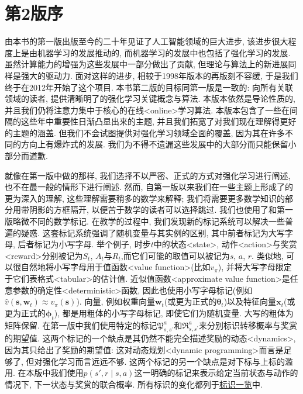 {}
\section*{第2版序}\label{sec:pautoreface_2}

由本书的第一版出版至今的二十年见证了人工智能领域的巨大进步, 该进步很大程度上是由机器学习的发展推动的, 而机器学习的发展中也包括了强化学习的发展. 虽然计算能力的增强为这些发展中一部分做出了贡献, 但理论与算法上的新进展同样是强大的驱动力. 面对这样的进步, 相较于1998年版本的再版刻不容缓, 于是我们终于在2012年开始了这个项目. 本书第二版的目标同第一版是一致的: 向所有关联领域的读者, 提供清晰明了的强化学习关键概念与算法. 本版本依然是导论性质的, 并且我们仍将注意力集中于核心的在线<online>学习算法. 本版本包含了一些在间隔的这些年中重要性日渐凸显出来的主题, 并且我们拓宽了对我们现在理解得更好的主题的涵盖. 但我们不会试图提供对强化学习领域全面的覆盖, 因为其在许多不同的方向上有爆炸式的发展. 我们为不得不遗漏这些发展中的大部分而只能保留小部分而道歉.

就像在第一版中做的那样, 我们选择不以严密、正式的方式对强化学习进行阐述, 也不在最一般的情形下进行阐述. 然而, 自第一版以来我们在一些主题上形成了的更为深入的理解, 这些理解需要稍多的数学来解释; 我们将需要更多数学知识的部分用带阴影的方框隔开, 以便苦于数学的读者可以选择跳过. 我们也使用了和第一版略微不同的数学标记. 在教学的过程中, 我们发现新的标记系统可以解决一些普遍的疑惑. 这套标记系统强调了随机变量与其实例的区别, 其中前者标记为大写字母, 后者标记为小写字母. 举个例子, 时步$t$中的状态<state>, 动作<action>与奖赏<reward>分别被记为$S_t$, $A_t$与$R_t$,而它们可能的取值可以被记为$s$, $a$, $r$. 类似地, 可以很自然地将小写字母用于值函数<value function>(比如$v_{\pi}$), 并将大写字母限定于它们表格式<tabular>的估计值.  近似值函数<approximate value function>是任意参数的确定性<deterministic>函数, 因此也使用小写字母标记(例如$\hat v (\mathbf s, \mathbf w_t) \approx v_\pi(\mathbf s)$). 向量, 例如权重向量$\mathbf w_t$(或更为正式的${\boldsymbol \theta}_t$)以及特征向量$\mathbf x_t$(或更为正式的$\boldsymbol \phi_t$), 都是用粗体的小写字母标记, 即使它们为随机变量. 大写的粗体为矩阵保留. 在第一版中我们使用特定的标记$\mathfrak P_{s, s^\prime}^a$和$\mathfrak R_{s, s^\prime}^a$来分别标识转移概率与奖赏的期望值. 这两个标记的一个缺点是其仍然不能完全描述奖励的动态<dynamics>, 因为其只给出了奖励的期望值: 这对动态规划<dynamic programming>而言是足够了, 但对强化学习而言远远不够. 这两个标记的另一个缺点是对下标与上标的滥用. 在本版中我们使用$p(s', r \mid s, a)$这一明确的标记来表示给定当前状态与动作的情况下, 下一状态与奖赏的联合概率. 所有标识的变化都列于\hyperlink{sec:notation}{标识一览}中.

